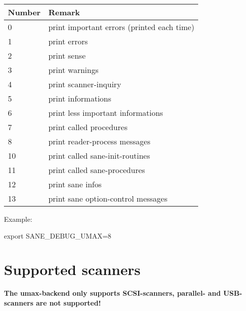 \small
\begin{tabular}{|l|l|}
\hline
Number&Remark\\
\hline
\hline
0&print important errors (printed each time)\\
1&print errors\\
2&print sense\\
3&print warnings\\
4&print scanner-inquiry\\
5&print informations\\
6&print less important informations\\
7&print called procedures\\
8&print reader-process messages\\
10&print called sane-init-routines\\
11&print called sane-procedures\\
12&print sane infos\\
13&print sane option-control messages\\
\hline
\end{tabular}
\normalsize


Example:

export SANE\_DEBUG\_UMAX=8




\newpage
\section{Supported scanners}

\bf{The umax-backend only supports SCSI-scanners, parallel- and USB-scanners are not supported!}

